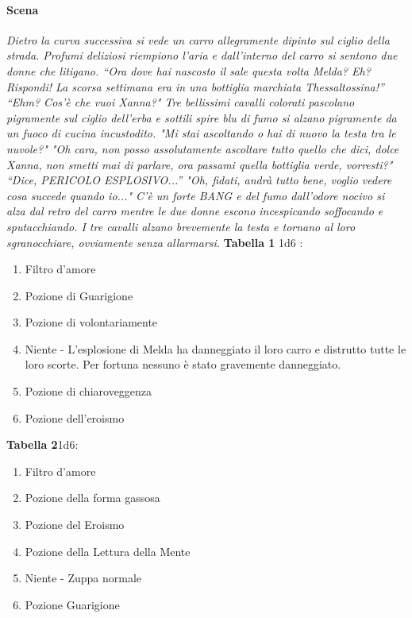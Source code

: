 \documentclass{article}
\begin{document}
\paragraph{Scena} \textit{Dietro la curva successiva si vede un carro allegramente dipinto sul ciglio della strada. Profumi deliziosi riempiono l'aria e dall'interno del carro si sentono due donne che litigano. “Ora dove hai nascosto il sale questa volta Melda? Eh? Rispondi! La scorsa settimana era in una bottiglia marchiata Thessaltossina!”
“Ehm? Cos'è che vuoi Xanna?" Tre bellissimi cavalli colorati pascolano pigramente sul ciglio dell'erba e sottili spire blu di fumo si alzano pigramente da un fuoco di cucina incustodito. "Mi stai ascoltando o hai di nuovo la testa tra le nuvole?"
"Oh cara, non posso assolutamente ascoltare tutto quello che dici, dolce Xanna, non smetti mai di parlare, ora passami quella bottiglia verde, vorresti?"
“Dice, PERICOLO ESPLOSIVO...”
"Oh, fidati, andrà tutto bene, voglio vedere cosa succede quando io..."
C'è un forte BANG e del fumo dall'odore nocivo si alza dal retro del carro mentre le due donne escono incespicando soffocando e sputacchiando. I tre cavalli alzano brevemente la testa e tornano al loro sgranocchiare, ovviamente senza allarmarsi.}
\textbf{Tabella 1} 1d6 :
\begin{enumerate}
    \item Filtro d'amore
    \item Pozione di Guarigione
    \item Pozione di volontariamente
    \item Niente - L'esplosione di Melda ha danneggiato il loro carro e distrutto tutte le loro scorte. Per fortuna nessuno è stato gravemente danneggiato.
    \item Pozione di chiaroveggenza
    \item Pozione dell'eroismo
\end{enumerate}
\textbf{Tabella 2}1d6: 
\begin{enumerate}
    \item Filtro d'amore
    \item Pozione della forma gassosa
    \item Pozione del Eroismo
    \item Pozione della Lettura della Mente
    \item Niente - Zuppa normale
    \item Pozione Guarigione
\end{enumerate}
\end{document}
